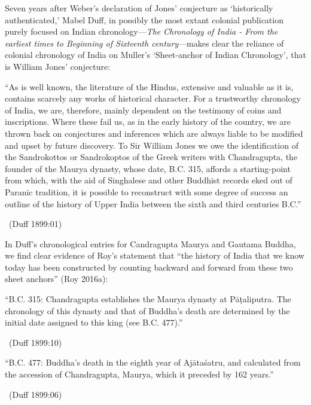 Seven years after Weber’s declaration of Jones’ conjecture as ‘historically authenticated,’ Mabel Duff, in possibly the most extant colonial publication purely focused on Indian chronology—\textit{The} \textit{Chronology of India - From the earliest times to Beginning of Sixteenth century}—makes clear the reliance of colonial chronology of India on Muller’s ‘Sheet-anchor of Indian Chronology’, that is William Jones’ conjecture:

\begin{myquote}
“As is well known, the literature of the Hindus, extensive and valuable as it is, contains scarcely any works of historical character. For a trustworthy chronology of India, we are, therefore, mainly dependent on the testimony of coins and inscriptions. Where these fail us, as in the early history of the country, we are thrown back on conjectures and inferences which are always liable to be modified and upset by future discovery. To Sir William Jones we owe the identification of the Sandrokottos or Sandrokoptos of the Greek writers with Chandragupta, the founder of the Maurya dynasty, whose date, B.C. 315, affords a starting-point from which, with the aid of Singhalese and other Buddhist records eked out of Paranic tradition, it is possible to reconstruct with some degree of success an outline of the history of Upper India between the sixth and third centuries B.C.” 

~\hfill (Duff 1899:01)
\end{myquote}

In Duff’s chronological entries for Candragupta Maurya and Gautama Buddha, we find clear evidence of Roy’s statement that “the history of India that we know today has been constructed by counting backward and forward from these two sheet anchors” (Roy 2016a):

\begin{myquote}
“B.C. 315: Chandragupta establishes the Maurya dynasty at Pāṭaliputra. The chronology of this dynasty and that of Buddha's death are determined by the initial date assigned to this king (see B.C. 477).” 

~\hfill (Duff 1899:10)
\end{myquote}

\begin{myquote}
“B.C. 477: Buddha's death in the eighth year of Ajātaśatru, and calculated from the accession of Chandragupta, Maurya, which it preceded by 162 years.” 

~\hfill (Duff 1899:06)
\end{myquote}

